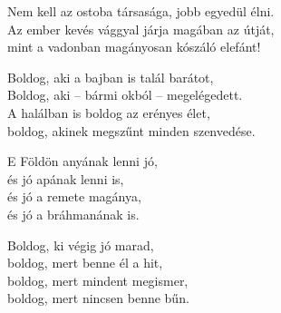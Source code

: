 \begin{dhpverse}

 Nem kell az ostoba társasága, jobb egyedül élni.\\
Az ember kevés vággyal járja magában az útját,\\
mint a vadonban magányosan kószáló elefánt!

 Boldog, aki a bajban is talál barátot,\\
Boldog, aki – bármi okból – megelégedett.\\
A halálban is boldog az erényes élet,\\
boldog, akinek megszűnt minden szenvedése.

 E Földön anyának lenni jó,\\
és jó apának lenni is,\\
és jó a remete magánya,\\
és jó a bráhmanának is.

 Boldog, ki végig jó marad,\\
boldog, mert benne él a hit,\\
boldog, mert mindent megismer,\\
boldog, mert nincsen benne bűn.

\end{dhpverse}
